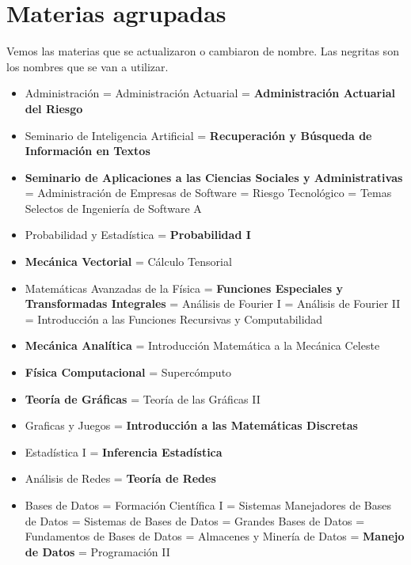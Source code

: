 \section{Materias agrupadas} \label{materias_agrupadas}

Vemos las materias que se actualizaron o cambiaron de nombre. Las negritas son los nombres que se van a utilizar.

\begin{itemize}
\item Administración = Administración Actuarial = \textbf{Administración Actuarial del Riesgo}

\item Seminario de Inteligencia Artificial = \textbf{Recuperación y Búsqueda de Información en Textos}

\item \textbf{Seminario de Aplicaciones a las Ciencias Sociales y Administrativas} = Administración de Empresas de Software = Riesgo Tecnológico = Temas Selectos de Ingeniería de Software A

\item Probabilidad y Estadística = \textbf{Probabilidad I}

\item \textbf{Mecánica Vectorial} = Cálculo Tensorial

\item Matemáticas Avanzadas de la Física = \textbf{Funciones Especiales y Transformadas Integrales} = Análisis de Fourier I = Análisis de Fourier II = Introducción a las Funciones Recursivas y Computabilidad

\item \textbf{Mecánica Analítica} = Introducción Matemática a la Mecánica Celeste

\item \textbf{Física Computacional} = Supercómputo

\item \textbf{Teoría de Gráficas} = Teoría de las Gráficas II

\item Graficas y Juegos = \textbf{Introducción a las Matemáticas Discretas}

\item Estadística I = \textbf{Inferencia Estadística}

\item Análisis de Redes = \textbf{Teoría de Redes}

\item Bases de Datos = Formación Científica I = Sistemas Manejadores de Bases de Datos = Sistemas de Bases de Datos = Grandes Bases de Datos = Fundamentos de Bases de Datos = Almacenes y Minería de Datos = \textbf{Manejo de Datos} = Programación II


\end{itemize}
